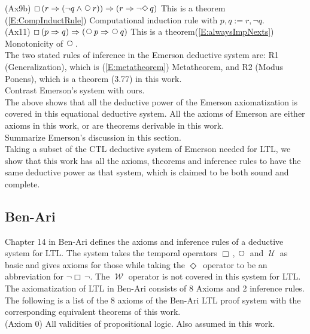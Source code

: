 \documentclass[12pt, fleqn, leqno]{article}
\newcommand{\impl}{\ensuremath{\Rightarrow}}        %
\newcommand{\Until}{\;\mathcal{U}\;}
\newcommand{\Wait}{\;\mathcal{W}\;}
\newcommand{\Next}{\;\,\text{\raisebox{3.5pt}{\circle{6}}}}
\newcommand{\Event}{\Diamond\,}
\newcommand{\Always}{\Box\,}
\begin{document}
(Ax9b) $\Always ( r \impl (\neg q \land \Next r)) \impl (r \impl \neg \Event q)$ This is a theorem (\ref{E:CompInductRule})
 Computational induction rule with $ p, q := r, \neg q$.\\

(Ax11) $\Always (p \impl q) \impl (\Next p \impl \Next q)$ This is a theorem(\ref{E:alwaysImpNexts}) Monotonicity of $\Next$.\\

The two stated rules of inference in the Emerson deductive system are: R1 (Generalization), which is (\ref{E:metatheorem}) Metatheorem,
and R2 (Modus Ponens), which is a theorem (3.77) in this work.\\

Contrast Emerson's system with ours.\\

The above shows that all the deductive power of the Emerson axiomatization is covered in this equational deductive system. All the axioms of Emerson are either axioms in this work, or are theorems derivable in this work.\\

Summarize Emerson's discussion in this section.\\

Taking a subset of the CTL deductive system of Emerson needed for LTL, we show that this work has all the axioms, 
theorems and inference rules to have the same deductive power as that system, which is claimed to be both sound and complete.\\

\subsection{Ben-Ari}

Chapter 14 in Ben-Ari \cite{Ben} defines the axioms and inference rules of a deductive system
for LTL. The system takes the temporal operators $\Always$, $\Next$ and $\Until$ as basic and gives axioms
for those while taking the $\Event$ operator to be an abbreviation for $\neg \Always \neg$. The $\Wait$ operator is not covered
in this system for LTL.\\

The axiomatization of LTL in Ben-Ari consists of 8 Axioms and 2 inference rules. The following is
a list of the 8 axioms of the Ben-Ari LTL proof system with the corresponding equivalent theorems of this work.\\

(Axiom 0) All validities of propositional logic. Also assumed in this work.\\
\end{document}
